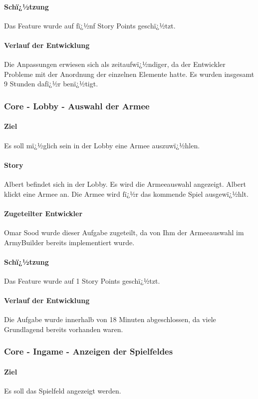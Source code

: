 \documentclass[12pt, titlepage]{scrartcl}
\begin{document}
		\paragraph{Schï¿½tzung}
		Das Feature wurde auf fï¿½nf Story Points geschï¿½tzt.
		\paragraph{Verlauf der Entwicklung} 
		Die Anpassungen erwiesen sich als zeitaufwï¿½ndiger, da der Entwickler Probleme mit der Anordnung der einzelnen Elemente hatte. Es wurden insgesamt 9 Stunden dafï¿½r benï¿½tigt.
		
		\subsubsection{Core - Lobby - Auswahl der Armee }
		\paragraph{Ziel} Es soll mï¿½glich sein in der Lobby eine Armee auszuwï¿½hlen. 
		\paragraph{Story} Albert befindet sich in der Lobby. Es wird die Armeeauswahl angezeigt. Albert klickt eine Armee an. Die Armee wird fï¿½r das kommende Spiel ausgewï¿½hlt.
		\paragraph{Zugeteilter Entwickler} Omar Sood wurde dieser Aufgabe zugeteilt, da von Ihm der Armeeauswahl im ArmyBuilder bereits implementiert wurde.
		\paragraph{Schï¿½tzung}
		Das Feature wurde auf 1 Story Points geschï¿½tzt.
		\paragraph{Verlauf der Entwicklung} 
		Die Aufgabe wurde innerhalb von 18 Minuten abgeschlossen, da viele Grundlagend bereits vorhanden waren.
		
		\subsubsection{Core - Ingame - Anzeigen der Spielfeldes}
		\paragraph{Ziel} Es soll das Spielfeld angezeigt werden.
\end{document}
